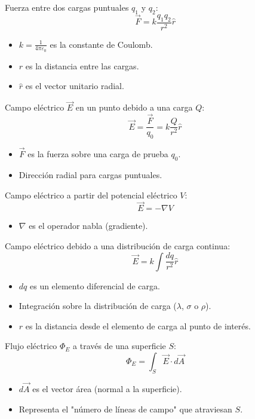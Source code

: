 \begin{tcolorbox}[title=Ley de Coulomb]
  Fuerza entre dos cargas puntuales $q_1$ y $q_2$:
  \[
    \vec{F} = k \frac{q_1 q_2}{r^2} \hat{r}
  \]
  \begin{itemize}
    \item $k = \frac{1}{4\pi\varepsilon_0}$ es la constante de Coulomb.
    \item $r$ es la distancia entre las cargas.
    \item $\hat{r}$ es el vector unitario radial.
  \end{itemize}
\end{tcolorbox}

\begin{tcolorbox}[title=Campo Eléctrico]
  Campo eléctrico $\vec{E}$ en un punto debido a una carga $Q$:
  \[
    \vec{E} = \frac{\vec{F}}{q_0} = k \frac{Q}{r^2} \hat{r}
  \]
  \begin{itemize}
    \item $\vec{F}$ es la fuerza sobre una carga de prueba $q_0$.
    \item Dirección radial para cargas puntuales.
  \end{itemize}

  Campo eléctrico a partir del potencial eléctrico $V$:
  \[
    \vec{E} = -\nabla V
  \]
  \begin{itemize}
    \item $\nabla$ es el operador nabla (gradiente).
  \end{itemize}
  Campo eléctrico debido a una distribución de carga continua:
  \[
    \vec{E} = k \int \frac{dq}{r^2} \hat{r}
  \]
  \begin{itemize}
    \item $dq$ es un elemento diferencial de carga.
    \item Integración sobre la distribución de carga (\(\lambda\), \(\sigma\) o \(\rho\)).
    \item $r$ es la distancia desde el elemento de carga al punto de interés.
  \end{itemize}
\end{tcolorbox}

\begin{tcolorbox}[title=Flujo Eléctrico]
  Flujo eléctrico $\Phi_E$ a través de una superficie $S$:
  \[
    \Phi_E = \int_S \vec{E} \cdot d\vec{A}
  \]
  \begin{itemize}
    \item $d\vec{A}$ es el vector área (normal a la superficie).
    \item Representa el "número de líneas de campo" que atraviesan $S$.
  \end{itemize}  
\end{tcolorbox}

